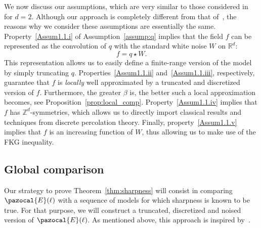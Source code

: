 \documentclass[10pt]{amsart}
\theoremstyle{definition}\newtheorem{defi}[theo]{Definition}\newtheorem{rema}[theo]{Remark}\newtheorem{exam}[theo]{Example}\newtheorem{exem}[theo]{Example}\newtheorem{nota}[theo]{Notation}
\newcommand{\R}{\mathbb{R}}
\newcommand{\Z}{\mathbb{Z}}
\begin{document}
We now discuss our assumptions, which are very similar to those considered in~\cite{MV} for $d=2$. Although our approach is completely different from that of~\cite{MV}, the reasons why we consider these assumptions are essentially the same. Property~\eqref{Assum1.1.i} of Assumption~\ref{assump:q} implies that the field $f$ can be represented as the convolution of $q$ with the standard white noise $W$ on $\R^d$:
\begin{equation}
f=q\star W.
\end{equation}
This representation allows us to easily define a finite-range version of the model by simply truncating $q$. Properties~\eqref{Assum1.1.ii} and~\eqref{Assum1.1.iii}, respectively, guarantee that $f$ is \emph{locally} well approximated by a truncated and discretized version of $f$. Furthermore, the greater $\beta$ is, the better such a local approximation becomes, see Proposition~\ref{prop:local_comp}. Property~\eqref{Assum1.1.iv} implies that $f$ has $\Z^d$-symmetries, which allows us to directly import classical results and techniques from discrete percolation theory. Finally, property~\eqref{Assum1.1.v} implies that $f$ is an increasing function of $W$, thus allowing us to make use of the FKG inequality.


\subsection{Global comparison}
Our strategy to prove Theorem~\ref{thm:sharpness} will consist in comparing $\pazocal{E}(\ell)$ with a sequence of models for which sharpness is known to be true. For that purpose, we will construct a truncated, discretized and noised version of $\pazocal{E}(\ell)$. As mentioned above, this approach is inspired by~\cite{DGRS19}.
\end{document}
